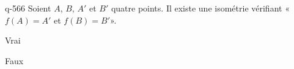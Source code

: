 \begin{truefalse}{q-566}
Soient $A$, $B$, $A'$ et $B'$ quatre points. Il existe une isométrie vérifiant «$f(A)=A'$ et $f(B)=B'$».
\item Vrai
\item* Faux
\end{truefalse}

